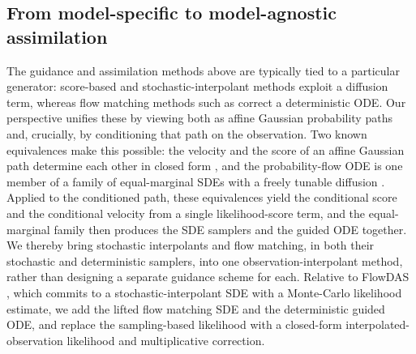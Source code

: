 \subsection{From model-specific to model-agnostic assimilation}
The guidance and assimilation methods above are typically tied to a particular generator: score-based and stochastic-interpolant methods exploit a diffusion term, whereas flow matching methods such as \cite{pokle_training-free_2024, zhang_flow_2025, yan_fig_2024} correct a deterministic ODE. Our perspective unifies these by viewing both as affine Gaussian probability paths \cite{albergo_stochastic_2023, lipman_flow_2023} and, crucially, by conditioning that path on the observation. Two known equivalences make this possible: the velocity and the score of an affine Gaussian path determine each other in closed form \cite{albergo_stochastic_2023, ma_sit_2024}, and the probability-flow ODE is one member of a family of equal-marginal SDEs with a freely tunable diffusion \cite{song_score-based_2021}. Applied to the conditioned path, these equivalences yield the conditional score and the conditional velocity from a single likelihood-score term, and the equal-marginal family then produces the SDE samplers and the guided ODE together. We thereby bring stochastic interpolants and flow matching, in both their stochastic and deterministic samplers, into one observation-interpolant method, rather than designing a separate guidance scheme for each. Relative to FlowDAS \cite{chen_flowdas_2025}, which commits to a stochastic-interpolant SDE with a Monte-Carlo likelihood estimate, we add the lifted flow matching SDE and the deterministic guided ODE, and replace the sampling-based likelihood with a closed-form interpolated-observation likelihood and multiplicative correction.




